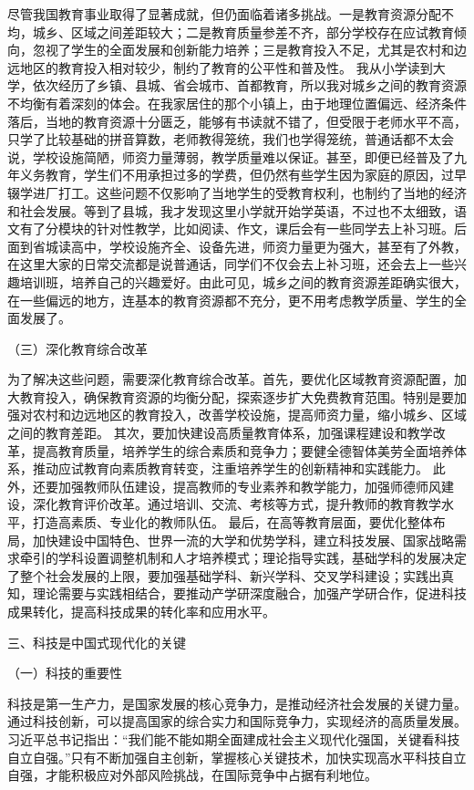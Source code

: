\documentclass{article} %
\begin{document}
\begin{CJK*}{UTF8}{gbsn}
尽管我国教育事业取得了显著成就，但仍面临着诸多挑战。一是教育资源分配不均，城乡、区域之间差距较大；二是教育质量参差不齐，部分学校存在应试教育倾向，忽视了学生的全面发展和创新能力培养；三是教育投入不足，尤其是农村和边远地区的教育投入相对较少，制约了教育的公平性和普及性。
我从小学读到大学，依次经历了乡镇、县城、省会城市、首都教育，所以我对城乡之间的教育资源不均衡有着深刻的体会。在我家居住的那个小镇上，由于地理位置偏远、经济条件落后，当地的教育资源十分匮乏，能够有书读就不错了，但受限于老师水平不高，只学了比较基础的拼音算数，老师教得笼统，我们也学得笼统，普通话都不太会说，学校设施简陋，师资力量薄弱，教学质量难以保证。甚至，即便已经普及了九年义务教育，学生们不用承担过多的学费，但仍然有些学生因为家庭的原因，过早辍学进厂打工。这些问题不仅影响了当地学生的受教育权利，也制约了当地的经济和社会发展。等到了县城，我才发现这里小学就开始学英语，不过也不太细致，语文有了分模块的针对性教学，比如阅读、作文，课后会有一些同学去上补习班。后面到省城读高中，学校设施齐全、设备先进，师资力量更为强大，甚至有了外教，在这里大家的日常交流都是说普通话，同学们不仅会去上补习班，还会去上一些兴趣培训班，培养自己的兴趣爱好。由此可见，城乡之间的教育资源差距确实很大，在一些偏远的地方，连基本的教育资源都不充分，更不用考虑教学质量、学生的全面发展了。

（三）深化教育综合改革

为了解决这些问题，需要深化教育综合改革。首先，要优化区域教育资源配置，加大教育投入，确保教育资源的均衡分配，探索逐步扩大免费教育范围。特别是要加强对农村和边远地区的教育投入，改善学校设施，提高师资力量，缩小城乡、区域之间的教育差距。
其次，要加快建设高质量教育体系，加强课程建设和教学改革，提高教育质量，培养学生的综合素质和竞争力；要健全德智体美劳全面培养体系，推动应试教育向素质教育转变，注重培养学生的创新精神和实践能力。
此外，还要加强教师队伍建设，提高教师的专业素养和教学能力，加强师德师风建设，深化教育评价改革。通过培训、交流、考核等方式，提升教师的教育教学水平，打造高素质、专业化的教师队伍。
最后，在高等教育层面，要优化整体布局，加快建设中国特色、世界一流的大学和优势学科，建立科技发展、国家战略需求牵引的学科设置调整机制和人才培养模式；理论指导实践，基础学科的发展决定了整个社会发展的上限，要加强基础学科、新兴学科、交叉学科建设；实践出真知，理论需要与实践相结合，要推动产学研深度融合，加强产学研合作，促进科技成果转化，提高科技成果的转化率和应用水平。

三、科技是中国式现代化的关键

（一）科技的重要性

科技是第一生产力，是国家发展的核心竞争力，是推动经济社会发展的关键力量。通过科技创新，可以提高国家的综合实力和国际竞争力，实现经济的高质量发展。习近平总书记指出：“我们能不能如期全面建成社会主义现代化强国，关键看科技自立自强。”只有不断加强自主创新，掌握核心关键技术，加快实现高水平科技自立自强，才能积极应对外部风险挑战，在国际竞争中占据有利地位。


\end{CJK*}
\end{document}
